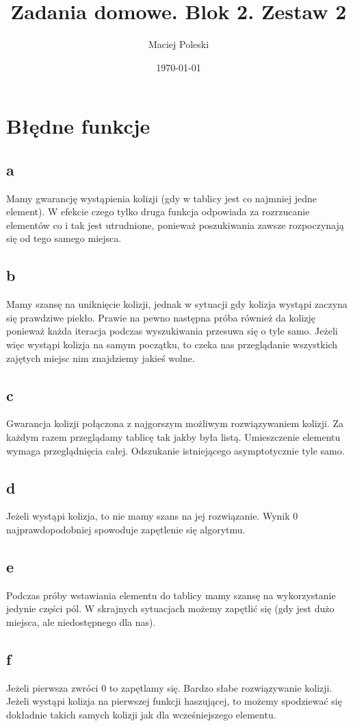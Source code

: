 \documentclass[a4paper,12pt]{article}
\title{Zadania domowe. Blok 2. Zestaw 2}
\author{Maciej Poleski}
\date{\today}
\begin{document}
\maketitle

\newpage

\section{Błędne funkcje}
\subsection{a}
Mamy gwarancję wystąpienia kolizji (gdy w tablicy jest co najmniej jedne element). W efekcie czego tylko druga funkcja odpowiada za rozrzucanie elementów co i tak jest utrudnione, ponieważ poszukiwania zawsze rozpoczynają się od tego samego miejsca.
\subsection{b}
Mamy szansę na uniknięcie kolizji, jednak w sytuacji gdy kolizja wystąpi zaczyna się prawdziwe piekło. Prawie na pewno następna próba również da kolizję ponieważ każda iteracja podczas wyszukiwania przesuwa się o tyle samo. Jeżeli więc wystąpi kolizja na samym początku, to czeka nas przeglądanie wszystkich zajętych miejsc nim znajdziemy jakieś wolne.
\subsection{c}
Gwarancja kolizji połączona z najgorszym możliwym rozwiązywaniem kolizji. Za każdym razem przeglądamy tablicę tak jakby była listą. Umieszczenie elementu wymaga przeglądnięcia całej. Odszukanie istniejącego asymptotycznie tyle samo.
\subsection{d}
Jeżeli wystąpi kolizja, to nie mamy szans na jej rozwiązanie. Wynik 0 najprawdopodobniej spowoduje zapętlenie się algorytmu.
\subsection{e}
Podczas próby wstawiania elementu do tablicy mamy szansę na wykorzystanie jedynie części pól. W skrajnych sytuacjach możemy zapętlić się (gdy jest dużo miejsca, ale niedostępnego dla nas).
\subsection{f}
Jeżeli pierwsza zwróci 0 to zapętlamy się. Bardzo słabe rozwiązywanie kolizji. Jeżeli wystąpi kolizja na pierwszej funkcji haszującej, to możemy spodziewać się dokładnie takich samych kolizji jak dla wcześniejszego elementu.
\end{document}
